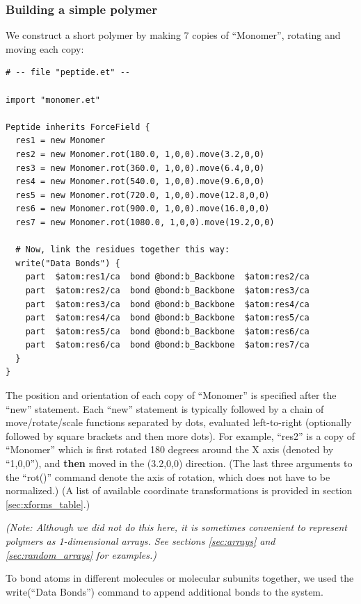 \documentclass[11pt]{article}
\begin{document}
\subsubsection{Building a simple polymer}
We construct a short polymer by making 7 copies of ``Monomer'',
rotating and moving each copy:
\label{sec:2beadPeptide}
\begin{verbatim}
# -- file "peptide.et" --

import "monomer.et"

Peptide inherits ForceField {
  res1 = new Monomer
  res2 = new Monomer.rot(180.0, 1,0,0).move(3.2,0,0)
  res3 = new Monomer.rot(360.0, 1,0,0).move(6.4,0,0)
  res4 = new Monomer.rot(540.0, 1,0,0).move(9.6,0,0)
  res5 = new Monomer.rot(720.0, 1,0,0).move(12.8,0,0)
  res6 = new Monomer.rot(900.0, 1,0,0).move(16.0,0,0)
  res7 = new Monomer.rot(1080.0, 1,0,0).move(19.2,0,0)

  # Now, link the residues together this way:
  write("Data Bonds") {
    part  $atom:res1/ca  bond @bond:b_Backbone  $atom:res2/ca
    part  $atom:res2/ca  bond @bond:b_Backbone  $atom:res3/ca
    part  $atom:res3/ca  bond @bond:b_Backbone  $atom:res4/ca
    part  $atom:res4/ca  bond @bond:b_Backbone  $atom:res5/ca
    part  $atom:res5/ca  bond @bond:b_Backbone  $atom:res6/ca
    part  $atom:res6/ca  bond @bond:b_Backbone  $atom:res7/ca
  }
}
\end{verbatim}
The position and orientation of each copy of ``Monomer'' 
is specified after the ``new'' statement. 
Each ``new'' statement is typically followed by a chain of 
move/rotate/scale functions separated by dots, evaluated left-to-right
(optionally followed by square brackets and then more dots). 
For example, ``res2'' is a copy of ``Monomer'' which is first rotated 
180 degrees around the X axis (denoted by ``1,0,0''), 
and \textbf{then} moved in the (3.2,0,0) direction.
(The last three arguments to the ``rot()'' command 
 denote the axis of rotation, which does not have to be normalized.)
(A list of available coordinate transformations 
is provided in section \ref{sec:xforms_table}.)

\textit{(Note: Although we did not do this here, 
it is sometimes convenient to represent polymers as 1-dimensional arrays. 
See sections \ref{sec:arrays} and \ref{sec:random_arrays} for examples.)}

To bond atoms in different molecules or molecular subunits together, we used 
the write(``Data Bonds'') command to append additional bonds to the system.
\end{document}
